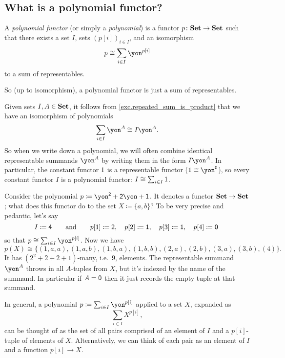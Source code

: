 \documentclass[Book-Poly]{subfiles}
\begin{document}
\subsection{What is a polynomial functor?} \label{subsec.poly.func_nat.repr_sum.what}

\begin{definition}
A \emph{polynomial functor} (or simply a \emph{polynomial}) is a functor $p\colon\mathbf{Set}\to\mathbf{Set}$ such that there exists a set $I$, sets $(p[i])_{i\in I}$, and an isomorphism
\[p\cong\sum_{i\in I}\yon^{p[i]}\]
to a sum of representables.
\end{definition}

So (up to isomorphism), a polynomial functor is just a sum of representables.

\begin{remark}
Given sets $I, A \in \mathbf{Set}$, it follows from \cref{exc.repeated_sum_is_product} that we have an isomorphism of polynomials
\[
    \sum_{i \in I} \yon^A \iso I\yon^A.
\]
So when we write down a polynomial, we will often combine identical representable summands $\yon^A$ by writing them in the form $I\yon^A$.
In particular, the constant functor $\textsf{1}$ is a representable functor ($\1 \iso \yon^\0$), so every constant functor $I$ is a polynomial functor: $I \cong \sum_{i \in I} \textsf{1}$.
\end{remark}

\begin{example}\label{ex.pedantic_poly_eval}
Consider the polynomial $p \coloneqq \yon^\2+\2\yon+\1$. It denotes a functor $\mathbf{Set}\to\mathbf{Set}$; what does this functor do to the set $X\coloneqq\{a,b\}$? 
To be very precise and pedantic, let's say
\[
I\coloneqq\textsf{4}\qquad\text{and}\qquad
  p[1]\coloneqq\textsf{2},\quad
  p[2]\coloneqq\textsf{1},\quad
  p[3]\coloneqq\textsf{1},\quad
  p[4]\coloneqq\textsf{0}\
\]
so that $p\cong\sum_{i\in I}\yon^{p[i]}$. Now we have
\[
p(X)\cong
\{(1,a,a),(1,a,b),(1,b,a),(1,b,b),(2,a),(2,b),(3,a),(3,b),(4)\}.
\]
It has $(2^2+2+2+1)$-many, i.e.\ $9$, elements. The representable summand $\yon^A$ throws in all $A$-tuples from $X$, but it's indexed by the name of the summand. In particular if $A=\textsf{0}$ then it just records the empty tuple at that summand.
\end{example}

In general, a polynomial $p\coloneqq\sum_{i\in I}\yon^{p[i]}$ applied to a set $X$, expanded as
\[
    \sum_{i\in I}X^{p[i]},
\]
can be thought of as the set of all pairs comprised of an element of $I$ and a $p[i]$-tuple of elements of $X$.
Alternatively, we can think of each pair as an element of $I$ and a function $p[i]\to X$.
\end{document}
